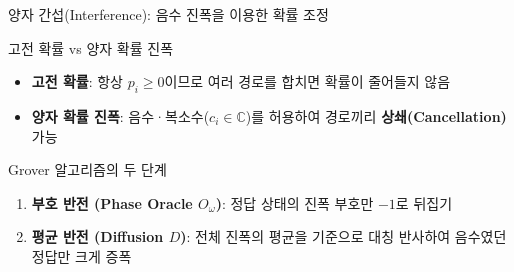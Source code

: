 \documentclass[aspectratio=169, 10pt]{beamer}
\begin{document}
\begin{frame}{양자 간섭(Interference): 음수 진폭을 이용한 확률 조정}
    \begin{qcblock}{고전 확률 vs 양자 확률 진폭}
        \begin{itemize}
            \item \textbf{고전 확률}: 항상 $p_i \ge 0$이므로 여러 경로를 합치면 확률이 줄어들지 않음
            \pause
            \item \textbf{양자 확률 진폭}: 음수·복소수($c_i \in \mathbb{C}$)를 허용하여 경로끼리 \textbf{상쇄(Cancellation)} 가능
        \end{itemize}
    \end{qcblock}
    \pause
    \vspace{0.15cm}
    \begin{qctip}{Grover 알고리즘의 두 단계}
        \begin{enumerate}
            \item \textbf{부호 반전 (Phase Oracle $O_\omega$)}: 정답 상태의 진폭 부호만 $-1$로 뒤집기
            \pause
            \item \textbf{평균 반전 (Diffusion $D$)}: 전체 진폭의 평균을 기준으로 대칭 반사하여 음수였던 정답만 크게 증폭
        \end{enumerate}
    \end{qctip}
\end{frame}
\end{document}
